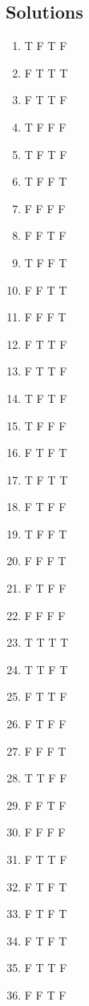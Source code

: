 \documentclass[10pt,a4paper]{article}
\begin{document}
\subsection{Solutions}
\begin{enumerate}[label=\textbf{\arabic*})]
\item T F T F
\item F T T T
\item F T T F
\item T F F F
\item T F T F
\item T F F T
\item F F F F
\item F F T F
\item T F F T
\item F F T T
\item F F F T
\item F T T F
\item F T T F
\item T F T F
\item T F F F
\item F T F T
\item T F T T
\item F T F F
\item T F F T
\item F F F T
\item F T F F
\item F F F F
\item T T T T
\item T T F T
\item F T T F
\item F T F F
\item F F F T
\item T T F F
\item F F T F
\item F F F F
\item F T T F
\item F T F T
\item F T F T
\item F T F T
\item F T T F
\item F F T F
\end{enumerate}
\end{document}
